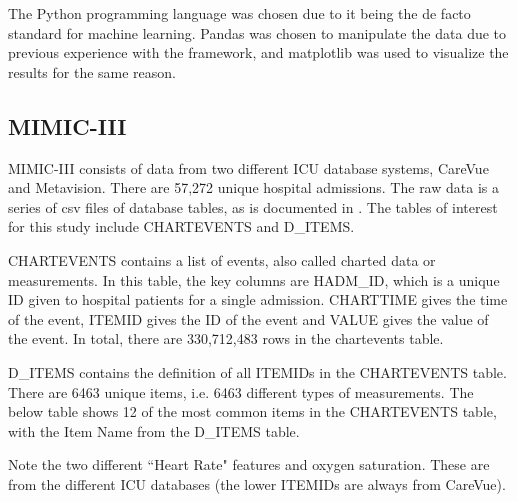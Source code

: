 \documentclass[12pt]{article}
\begin{document}
The Python programming language was chosen due to it being the de facto standard for machine learning. Pandas \cite{pandas} was chosen to manipulate the data due to previous experience with the framework, and matplotlib \cite{matplotlib} was used to visualize the results for the same reason. 

\subsection{MIMIC-III}

MIMIC-III consists of data from two different ICU database systems, CareVue and Metavision. There are 57,272 unique hospital admissions. The raw data is a series of csv files of database tables, as is documented in \cite{MIMICIIIdatabase}. The tables of interest for this study include CHARTEVENTS and D\_ITEMS. 

CHARTEVENTS contains a list of events, also called charted data or measurements. In this table, the key columns are HADM\_ID, which is a unique ID given to hospital patients for a single admission. CHARTTIME gives the time of the event, ITEMID gives the ID of the event and VALUE gives the value of the event. In total, there are 330,712,483 rows in the chartevents table.

D\_ITEMS contains the definition of all ITEMIDs in the CHARTEVENTS table. There are 6463 unique items, i.e. 6463 different types of measurements. The below table shows 12 of the most common items in the CHARTEVENTS table, with the Item Name from the D\_ITEMS table.

Note the two different ``Heart Rate" features and oxygen saturation. These are from the different ICU databases (the lower ITEMIDs are always from CareVue).
\end{document}
